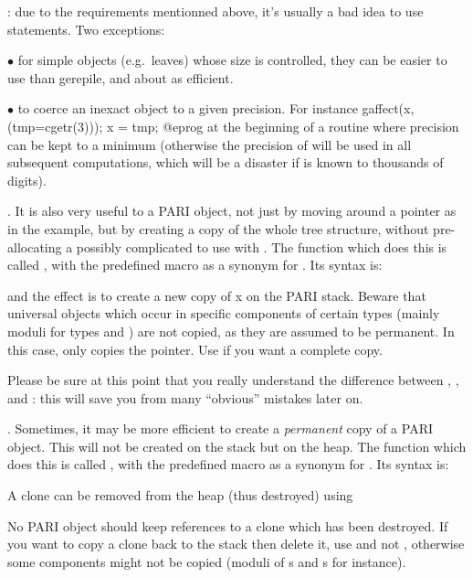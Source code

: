 
: due to the requirements mentionned above, it's usually
a bad idea to use  statements. Two exceptions:

$\bullet$ for simple objects (e.g.~leaves) whose size is controlled, they can
be easier to use than gerepile, and about as efficient.

$\bullet$ to coerce an inexact object to a given precision. For instance
\bprog
gaffect(x, (tmp=cgetr(3))); x = tmp;
@eprog
\noindent at the beginning of a routine where precision can be kept to a
minimum (otherwise the precision of  will be used in all subsequent
computations, which will be a disaster if  is known to thousands of
digits).

. It is also very useful to  a PARI object, not
just by moving around a pointer as in the  example, but by
creating a copy of the whole tree structure, without pre-allocating a
possibly complicated  to use with . The function which
does this is called , with the predefined macro
 as a synonym for . Its syntax is:


\noindent and the effect is to create a new copy of x on the PARI stack.
Beware that universal objects which occur in specific components of certain
types (mainly moduli for types  and ) are not
copied, as they are assumed to be permanent. In this case,  only
copies the pointer. Use  if you want a complete
copy.

Please be sure at this point that you really understand the difference between
, , and : this will save you
from many ``obvious'' mistakes later on.

.
Sometimes, it may be more efficient to create a {\it permanent\/} copy of a
PARI object. This will not be created on the stack but on the heap. The
function which does this is called , with the predefined macro
 as a synonym for . Its syntax is:


A clone can be removed from the heap (thus destroyed) using


\noindent No PARI object should keep references to a clone which has been
destroyed. If you want to copy a clone back to the stack then delete it, use
 and not , otherwise some components might not be
copied (moduli of s and s for instance).

